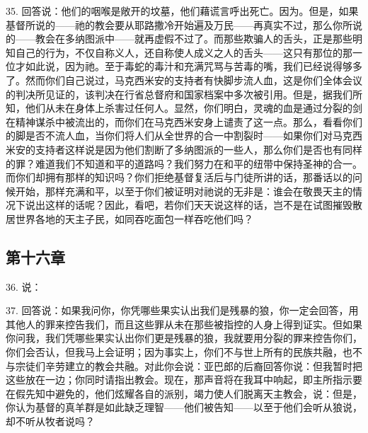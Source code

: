 35. 回答说：他们的咽喉是敞开的坟墓，他们藉谎言呼出死亡。因为。但是，如果基督所说的——祂的教会要从耶路撒冷开始遍及万民——再真实不过，那么你所说的——教会在多纳图派中——就再虚假不过了。而那些欺骗人的舌头，正是那些明知自己的行为，不仅自称义人，还自称使人成义之人的舌头——这只有那位的那一位才如此说，因为祂。至于毒蛇的毒汁和充满咒骂与苦毒的嘴，我们已经说得够多了。然而你们自己说过，马克西米安的支持者有快脚步流人血，这是你们全体会议的判决所见证的，该判决在行省总督府和国家档案中多次被引用。但是，据我们所知，他们从未在身体上杀害过任何人。显然，你们明白，灵魂的血是通过分裂的剑在精神谋杀中被流出的，而你们在马克西米安身上谴责了这一点。那么，看看你们的脚是否不流人血，当你们将人们从全世界的合一中割裂时——如果你们对马克西米安的支持者这样说是因为他们割断了多纳图派的一些人，那么你们是否也有同样的罪？难道我们不知道和平的道路吗？我们努力在和平的纽带中保持圣神的合一。而你们却拥有那样的知识吗？你们拒绝基督复活后与门徒所讲的话，那番话以的问候开始，那样充满和平，以至于你们被证明对祂说的无非是：谁会在敬畏天主的情况下说出这样的话呢？因此，看吧，若你们天天说这样的话，岂不是在试图摧毁散居世界各地的天主子民，如同吞吃面包一样吞吃他们吗？\par


\subsection{第十六章}

36. 说：\par

37. 回答说：如果我问你，你凭哪些果实认出我们是残暴的狼，你一定会回答，用其他人的罪来控告我们，而且这些罪从未在那些被指控的人身上得到证实。但如果你问我，我们凭哪些果实认出你们更是残暴的狼，我就要用分裂的罪来控告你们，你们会否认，但我马上会证明；因为事实上，你们不与世上所有的民族共融，也不与宗徒们辛劳建立的教会共融。对此你会说：亚巴郎的后裔回答你说：但我暂时把这些放在一边；你同时请指出教会。现在，那声音将在我耳中响起，即主所指示要在假先知中避免的，他们炫耀各自的派别，竭力使人们脱离天主教会，说：但是，你认为基督的真羊群是如此缺乏理智——他们被告知——以至于他们会听从狼说，却不听从牧者说吗？\par


